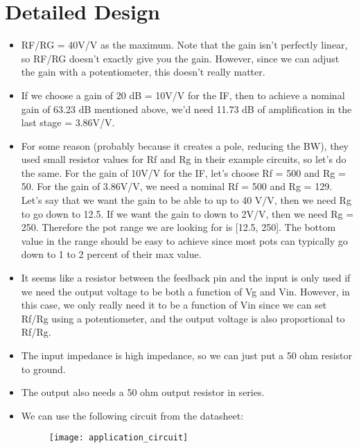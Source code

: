 \documentclass[12pt, letterpaper]{article}
\begin{document}
\section{Detailed Design}

\begin{itemize}
    \item RF/RG = 40V/V as the maximum. Note that the gain isn't perfectly linear, so RF/RG doesn't exactly give you the gain. However, since we can adjust the gain with a potentiometer, this doesn't really matter.
    \item If we choose a gain of 20 dB = 10V/V for the IF, then to achieve a nominal gain of 63.23 dB mentioned above, we'd need 11.73 dB of amplification in the last stage = 3.86V/V. 
    \item For some reason (probably because it creates a pole, reducing the BW), they used small resistor values for Rf and Rg in their example circuits, so let's do the same. For the gain of 10V/V for the IF, let's choose Rf = 500 and Rg = 50. For the gain of 3.86V/V, we need a nominal Rf = 500 and Rg = 129. Let's say that we want the gain to be able to up to 40 V/V, then we need Rg to go down to 12.5. If we want the gain to down to 2V/V, then we need Rg = 250. Therefore the pot range we are looking for is [12.5, 250]. The bottom value in the range should be easy to achieve since most pots can typically go down to 1 to 2 percent of their max value. 
    \item It seems like a resistor between the feedback pin and the input is only used if we need the output voltage to be both a function of Vg and Vin. However, in this case, we only really need it to be a function of Vin since we can set Rf/Rg using a potentiometer, and the output voltage is also proportional to Rf/Rg.
    \item The input impedance is high impedance, so we can just put a 50 ohm resistor to ground.
    \item The output also needs a 50 ohm output resistor in series. 
    \item We can use the following circuit from the datasheet: 
    \begin{figure}[h]
        \texttt{[image: application\_circuit]}
    \end{figure}
\end{itemize}
\end{document}
